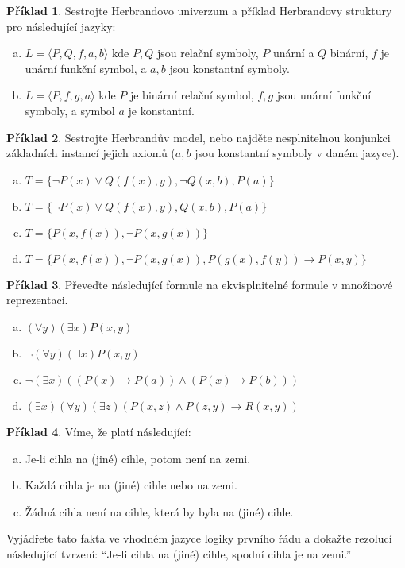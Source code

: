 \documentclass[11pt,a4paper]{amsart}
\theoremstyle{definition}
\newtheorem{problem}{Příklad}
\theoremstyle{remark}
\begin{document}
\bigskip

\begin{problem} Sestrojte Herbrandovo univerzum a příklad Herbrandovy struktury pro následující jazyky:
\medskip
\begin{enumerate}[(a)]
\itemsep12pt
\item $L=\langle P,Q,f,a,b \rangle$ kde  $P,Q$ jsou relační symboly, $P$ unární a $Q$ binární, $f$ je unární funkční symbol, a $a,b$ jsou konstantní symboly.
\item $L=\langle P,f,g,a \rangle$ kde $P$ je binární relační symbol, $f,g$ jsou unární funkční symboly, a symbol $a$ je konstantní.
\end{enumerate}
\end{problem}

\bigskip



\begin{problem} Sestrojte Herbrandův model, nebo najděte nesplnitelnou konjunkci základních instancí jejich axiomů ($a,b$ jsou konstantní symboly v daném jazyce).
\medskip
\begin{enumerate}[(a)]
\itemsep12pt
\item $T=\{\neg P(x)\vee Q(f(x),y), \neg Q(x,b), P(a)\}$
\item $T=\{\neg P(x)\vee Q(f(x),y), Q(x,b), P(a)\}$
\item $T=\{P(x,f(x)),\neg P(x,g(x))\}$
\item $T=\{P(x,f(x)),\neg P(x,g(x)), P(g(x),f(y)) \to P(x,y)\}$
\end{enumerate}
\end{problem}

\bigskip

\begin{problem} Převeďte následující formule na ekvisplnitelné formule v množinové reprezentaci.
\medskip
\begin{enumerate}[(a)]
\itemsep12pt
\item $(\forall y)(\exists x)P(x,y)$
\item $\neg (\forall y)(\exists x)P(x,y)$
\item $\neg (\exists x)((P(x)\to P(a))\wedge (P(x)\to P(b)))$
\item $(\exists x)(\forall y)(\exists z)(P(x,z)\wedge P(z,y) \to R(x,y))$
\end{enumerate}
\end{problem}

\bigskip

\begin{problem} Víme, že platí následující:
\medskip
\begin{enumerate}[(a)]
\itemsep12pt
\item Je-li cihla na (jiné) cihle, potom není na zemi.
\item Každá cihla je na (jiné) cihle nebo na zemi.
\item Žádná cihla není na cihle, která by byla na (jiné) cihle.
\end{enumerate}
\medskip
Vyjádřete tato fakta ve vhodném jazyce logiky prvního řádu a dokažte rezolucí následující tvrzení: ``Je-li cihla na (jiné) cihle, spodní cihla je na zemi.''
\end{problem}
\end{document}
